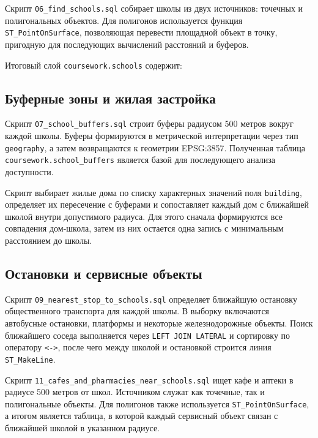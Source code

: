 \documentclass[a4paper,article,14pt]{extarticle}
\begin{document}
Скрипт \texttt{06\_find\_schools.sql} собирает школы из двух источников:
точечных и полигональных объектов. Для полигонов используется функция
\texttt{ST\_PointOnSurface}, позволяющая перевести площадной объект в точку,
пригодную для последующих вычислений расстояний и буферов.

Итоговый слой \texttt{coursework.schools} содержит:

\subsection{Буферные зоны и жилая застройка}

Скрипт \texttt{07\_school\_buffers.sql} строит буферы радиусом 500 метров вокруг
каждой школы. Буферы формируются в метрической интерпретации через тип
\texttt{geography}, а затем возвращаются к геометрии EPSG:3857. Полученная
таблица \texttt{coursework.school\_buffers} является базой для последующего
анализа доступности.

Скрипт  выбирает жилые дома по
списку характерных значений поля \texttt{building}, определяет их пересечение с
буферами и сопоставляет каждый дом с ближайшей школой внутри допустимого радиуса.
Для этого сначала формируются все совпадения дом-школа, затем из них остается
одна запись с минимальным расстоянием до школы.

\subsection{Остановки и сервисные объекты}

Скрипт \texttt{09\_nearest\_stop\_to\_schools.sql} определяет ближайшую остановку
общественного транспорта для каждой школы. В выборку включаются автобусные
остановки, платформы и некоторые железнодорожные объекты. Поиск ближайшего
соседа выполняется через \texttt{LEFT JOIN LATERAL} и сортировку по оператору
\texttt{<->}, после чего между школой и остановкой строится линия
\texttt{ST\_MakeLine}.

Скрипт \texttt{11\_cafes\_and\_pharmacies\_near\_schools.sql} ищет кафе и аптеки в
радиусе 500 метров от школ. Источником служат как точечные, так и полигональные
объекты. Для полигонов также используется \texttt{ST\_PointOnSurface}, а итогом
является таблица, в которой каждый сервисный объект связан с ближайшей школой в
указанном радиусе.
\end{document}
